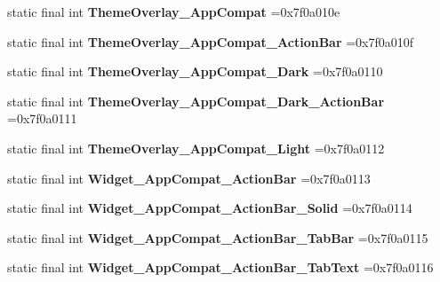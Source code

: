 \begin{DoxyCompactItemize}
static final int {\bfseries Theme\+Overlay\+\_\+\+App\+Compat} =0x7f0a010e
\item 
\mbox{\label{classproject4_1_1xaria_1_1R_1_1style_acae80c97d36e23d03aebd3c71293adee}} 
static final int {\bfseries Theme\+Overlay\+\_\+\+App\+Compat\+\_\+\+Action\+Bar} =0x7f0a010f
\item 
\mbox{\label{classproject4_1_1xaria_1_1R_1_1style_a8e662366dd06e10e75aa445ea312b62f}} 
static final int {\bfseries Theme\+Overlay\+\_\+\+App\+Compat\+\_\+\+Dark} =0x7f0a0110
\item 
\mbox{\label{classproject4_1_1xaria_1_1R_1_1style_a7e9a395124d4646bb9f93205a0f130f7}} 
static final int {\bfseries Theme\+Overlay\+\_\+\+App\+Compat\+\_\+\+Dark\+\_\+\+Action\+Bar} =0x7f0a0111
\item 
\mbox{\label{classproject4_1_1xaria_1_1R_1_1style_adf1002ab3f36043c3c427fc13dde3b05}} 
static final int {\bfseries Theme\+Overlay\+\_\+\+App\+Compat\+\_\+\+Light} =0x7f0a0112
\item 
\mbox{\label{classproject4_1_1xaria_1_1R_1_1style_a6f925ddda4c0f69e09436d748388f682}} 
static final int {\bfseries Widget\+\_\+\+App\+Compat\+\_\+\+Action\+Bar} =0x7f0a0113
\item 
\mbox{\label{classproject4_1_1xaria_1_1R_1_1style_a59f348d6635a1ecfa59fd108462fa93e}} 
static final int {\bfseries Widget\+\_\+\+App\+Compat\+\_\+\+Action\+Bar\+\_\+\+Solid} =0x7f0a0114
\item 
\mbox{\label{classproject4_1_1xaria_1_1R_1_1style_aba4ef88d6e763c74a0a7a42c824f853c}} 
static final int {\bfseries Widget\+\_\+\+App\+Compat\+\_\+\+Action\+Bar\+\_\+\+Tab\+Bar} =0x7f0a0115
\item 
\mbox{\label{classproject4_1_1xaria_1_1R_1_1style_a364d1129e083bc4977a0b942c08b41f8}} 
static final int {\bfseries Widget\+\_\+\+App\+Compat\+\_\+\+Action\+Bar\+\_\+\+Tab\+Text} =0x7f0a0116
\item 

\end{DoxyCompactItemize}
